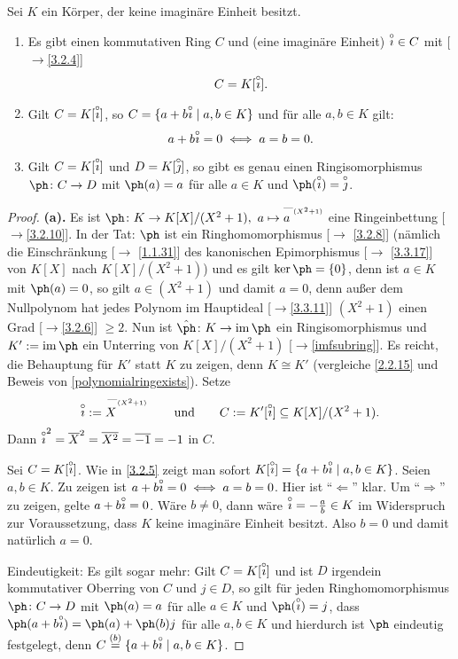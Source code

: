 \documentclass[../../main.tex]{subfiles}
\begin{document}
\begin{sat}\label{4.2.3}
Sei $K$ ein Körper, der keine imaginäre Einheit besitzt.
\begin{enumerate}[\rm(a)]
\item Es gibt einen kommutativen Ring $C$ und (eine imaginäre Einheit) $\overset\circ\imath\in C$ mit {\rm[$\to$\ref{3.2.4}]} $$C=K[\overset\circ\imath].$$
\item Gilt $C=K[\overset\circ\imath]$, so $C=\{a+b\overset\circ\imath\mid a,b\in K\}$ und für alle $a,b\in K$ gilt:
$$a+b\overset\circ\imath=0\iff a=b=0.$$
\item Gilt $C=K[\overset\circ\imath]$ und $D=K[\overset\circ\jmath]$, so gibt es genau einen Ringisomorphismus $\ph\colon C\to D$ mit $\ph(a)=a$ für alle $a\in K$ und $\ph(\i)=\j$.
\end{enumerate}
\end{sat}
\begin{proof}
{\bf (a).} Es ist $\ph\colon K\to K[X]/(X^2+1),\ a\mapsto\overset{\text{---}_{(X^2+1)}}{a~~~~~~~~}$ eine Ringeinbettung [$\to$\ref{3.2.10}]. In der Tat: $\ph$ ist ein Ringhomomorphismus
[$\to$ \ref{3.2.8}] (nämlich die Einschränkung [$\to$ \ref{1.1.31}] des kanonischen Epimorphismus [$\to$ \ref{3.3.17}] von $K[X]$ nach $K[X]/(X^2+1)$) und es gilt $\ker\ph=\{0\}$, denn ist $a\in K$
mit $\ph(a)=0$, so gilt $a\in(X^2+1)$ und damit $a=0$, denn außer dem Nullpolynom hat jedes Polynom im Hauptideal [$\to$\ref{3.3.11}] $(X^2+1)$ einen Grad [$\to$\ref{3.2.6}]  $\ge2$.
Nun ist $\hat\ph\colon K\to\im\ph$ ein Ringisomorphismus und $K':=\im\ph$ ein Unterring von $K[X]/(X^2+1)$ [$\to$\ref{imfsubring}].
Es reicht, die Behauptung für $K'$ statt $K$ zu zeigen, denn
$K\cong K'$ (vergleiche \ref{2.2.15} und Beweis von \ref{polynomialringexists}). Setze
$$\overset\circ\imath:=\overset{\text{---}_{(X^2+1)}}{X~~~~~~~~}\qquad\text{und}\qquad C:=K'[\overset\circ\imath]\subseteq K[X]/(X^2+1).$$
Dann $\overset\circ\imath^2=\overline X^2=\overline{X^2}=\overline{-1}=-1$ in $C$.

\medskip{} Sei $C=K[\overset\circ\imath]$.
Wie in \ref{3.2.5} zeigt man sofort $K[\overset\circ\imath]=\{a+b\overset\circ\imath\mid a,b\in K\}$. Seien $a,b\in K$.
Zu zeigen ist $a+b\overset\circ\imath=0\iff a=b=0$.
Hier ist "`$\Longleftarrow$"' klar. Um "`$\Longrightarrow$"' zu zeigen, gelte $a+b\overset\circ\imath=0$. Wäre $b\ne0$, dann wäre $\overset\circ\imath=-\frac ab\in K$ im Widerspruch zur Voraussetzung, dass $K$ keine imaginäre Einheit besitzt. Also $b=0$ und damit natürlich $a=0$.

\medskip{} Eindeutigkeit: Es gilt sogar mehr:
Gilt $C=K[\overset\circ\imath]$ und ist $D$ irgendein kommutativer Oberring von $C$ und $j\in D$, so gilt für jeden Ringhomomorphismus $\ph\colon C\to D$ mit $\ph(a)=a$ für alle $a\in K$ und $\ph(\i)=j$, dass $\ph(a+b\i)=\ph(a)+\ph(b)j$ für alle $a,b\in K$ und hierdurch ist $\ph$ eindeutig festgelegt, denn $C\overset{(b)}=\{a+b\overset\circ\imath\mid a,b\in K\}$.


\end{proof}
\end{document}
